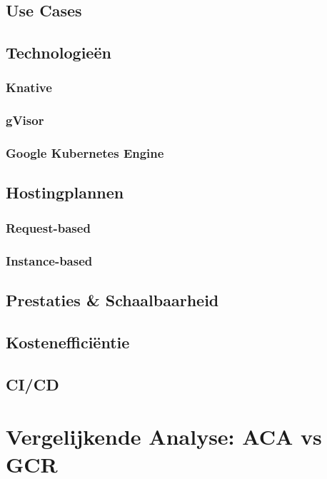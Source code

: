 \subsection{Use Cases}

\subsection{Technologieën}

\subsubsection{Knative}

\subsubsection{gVisor}

\subsubsection{Google Kubernetes Engine}

\subsection{Hostingplannen}

\subsubsection{Request-based}

\subsubsection{Instance-based}

\subsection{Prestaties \& Schaalbaarheid}

\subsection{Kostenefficiëntie}

\subsection{CI/CD}

\section{Vergelijkende Analyse: ACA vs GCR}